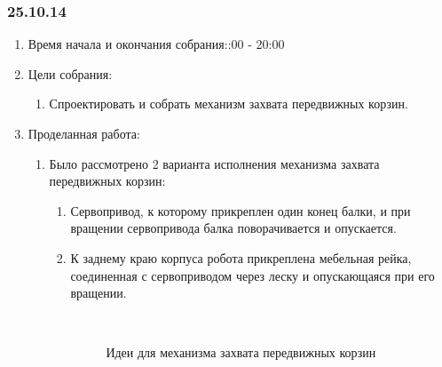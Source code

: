 
\subsubsection{25.10.14}

\begin{enumerate}
	\item Время начала и окончания собрания::00 - 20:00
	\item Цели собрания:\newline
	\begin{enumerate}
	  \item Спроектировать и собрать механизм захвата передвижных корзин.\newline
	  
    \end{enumerate}
    
	\item Проделанная работа:\newline
	\begin{enumerate}
	  \item Было рассмотрено 2 варианта исполнения механизма захвата передвижных корзин:\newline
	  \begin{enumerate}
	    \item Сервопривод, к которому прикреплен один конец балки, и при вращении сервопривода балка поворачивается и опускается.\newline
	    
	    \item К заднему краю корпуса робота прикреплена мебельная рейка, соединенная с сервоприводом через леску и опускающаяся при его вращении.\newline
	    
	    \begin{figure}[H]
	    	\begin{minipage}[h]{0.2\linewidth}
	    		\center   
	    	\end{minipage}
	    	\begin{minipage}[h]{0.6\linewidth}
	    		\caption{Идеи для механизма захвата передвижных корзин}
	    	\end{minipage}
	    \end{figure}
	    

\end{enumerate}
\end{enumerate}
\end{enumerate}
